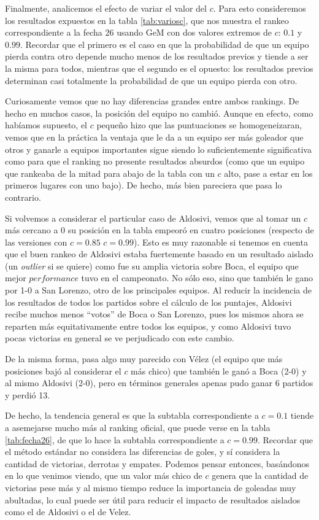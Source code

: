 Finalmente, analicemos el efecto de variar el valor del $c$. Para esto consideremos los resultados expuestos en la tabla \ref{tab:variosc}, que nos muestra el rankeo correspondiente a la fecha 26 usando GeM con dos valores extremos de $c$: $0.1$ y $0.99$. Recordar que el primero es el caso en que la probabilidad de que un equipo pierda contra otro depende mucho menos de los resultados previos y tiende a ser la misma para todos, mientras que el segundo es el opuesto: los resultados previos determinan casi totalmente la probabilidad de que un equipo pierda con otro.

Curiosamente vemos que no hay diferencias grandes entre ambos rankings. De hecho en muchos casos, la posición del equipo no cambió. Aunque en efecto, como habíamos supuesto, el $c$ pequeño hizo que las puntuaciones se homogeneizaran, vemos que en la práctica la ventaja que le da a un equipo ser más goleador que otros y ganarle a equipos importantes sigue siendo lo suficientemente significativa como para que el ranking no presente resultados absurdos (como que un equipo que rankeaba de la mitad para abajo de la tabla con un $c$ alto, pase a estar en los primeros lugares con uno bajo). De hecho, más bien pareciera que pasa lo contrario. 

Si volvemos a considerar el particular caso de Aldosivi, vemos que al tomar un $c$ más cercano a 0 su posición en la tabla empeoró en cuatro posiciones (respecto de las versiones con $c=0.85$ $c=0.99$). Esto es muy razonable si tenemos en cuenta que el buen rankeo de Aldosivi estaba fuertemente basado en un resultado aislado (un \emph{outlier} si se quiere) como fue su amplia victoria sobre Boca, el equipo que mejor $performance$ tuvo en el campeonato. No sólo eso, sino que también le gano por 1-0 a San Lorenzo, otro de los principales equipos. Al reducir la incidencia de los resultados de todos los partidos sobre el cálculo de los puntajes, Aldosivi recibe muchos menos ``votos'' de Boca o San Lorenzo, pues los mismos ahora se reparten más equitativamente entre todos los equipos, y como Aldosivi tuvo pocas victorias en general se ve perjudicado con este cambio.

De la misma forma, pasa algo muy parecido con Vélez (el equipo que más posiciones bajó al considerar el $c$ más chico) que también le ganó a Boca (2-0) y al mismo Aldosivi (2-0), pero en términos generales apenas pudo ganar 6 partidos y perdió 13.

De hecho, la tendencia general es que la subtabla correspondiente a $c=0.1$ tiende a asemejarse mucho más al ranking oficial, que puede verse en la tabla \ref{tab:fecha26}, de que lo hace la subtabla correspondiente a $c=0.99$. Recordar que el método estándar no considera las diferencias de goles, y sí considera la cantidad de victorias, derrotas y empates. Podemos pensar entonces, basándonos en lo que venimos viendo, que un valor más chico de $c$ genera que la cantidad de victorias pese más y al mismo tiempo reduce la importancia de goleadas muy abultadas, lo cual puede ser útil para reducir el impacto de resultados aislados como el de Aldosivi o el de Velez.

